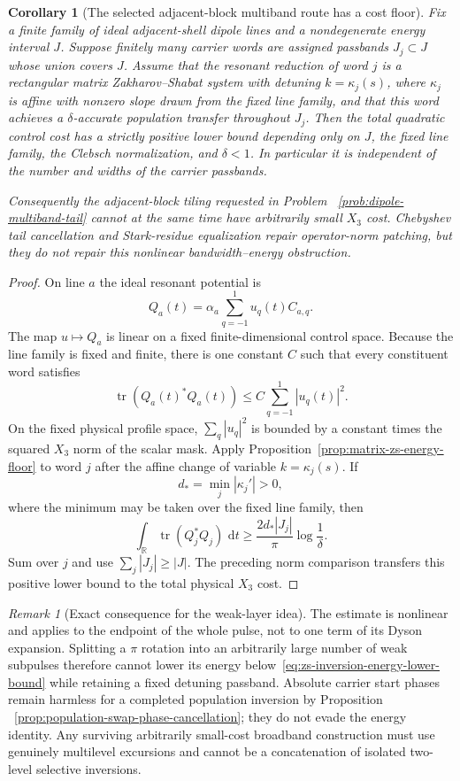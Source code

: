 \documentclass[11pt]{article}
\newtheorem{corollary}[theorem]{Corollary}
\theoremstyle{remark}
\newtheorem{remark}[theorem]{Remark}
\newcommand{\dd}{\,\mathrm d}
\newcommand{\tr}{\operatorname{tr}}
\begin{document}
\begin{corollary}[The selected adjacent-block multiband route has a cost floor]
\label{cor:dipole-multiband-energy-no-go}
Fix a finite family of ideal adjacent-shell dipole lines and a nondegenerate
energy interval $J$.  Suppose finitely many carrier words are assigned
passbands $J_j\subset J$ whose union covers $J$.  Assume that the resonant
reduction of word $j$ is a rectangular matrix Zakharov--Shabat system with
detuning $k=\kappa_j(s)$, where $\kappa_j$ is affine with nonzero slope drawn
from the fixed line family, and that this word achieves a $\delta$-accurate
population transfer throughout $J_j$.  Then the total quadratic control cost
has a strictly positive lower bound depending only on $J$, the fixed line
family, the Clebsch normalization, and $\delta<1$.  In particular it is
independent of the number and widths of the carrier passbands.

Consequently the adjacent-block tiling requested in Problem
~\ref{prob:dipole-multiband-tail} cannot at the same time have arbitrarily
small $X_3$ cost.  Chebyshev tail cancellation and Stark-residue equalization
repair operator-norm patching, but they do not repair this nonlinear
bandwidth--energy obstruction.
\end{corollary}

\begin{proof}
On line $a$ the ideal resonant potential is
\[
 Q_a(t)=\alpha_a\sum_{q=-1}^{1}u_q(t)C_{a,q}.
\]
The map $u\mapsto Q_a$ is linear on a fixed finite-dimensional control space.
Because the line family is fixed and finite, there is one constant $C$ such
that every constituent word satisfies
\[
 \tr(Q_a(t)^*Q_a(t))
 \leq C\sum_{q=-1}^{1}|u_q(t)|^2.
\]
On the fixed physical profile space,
$\sum_q|u_q|^2$ is bounded by a constant times the squared $X_3$ norm of the
scalar mask.  Apply Proposition~\ref{prop:matrix-zs-energy-floor} to word $j$
after the affine change of variable $k=\kappa_j(s)$.  If
\[
 d_*=\min_j|\kappa_j'|>0,
\]
where the minimum may be taken over the fixed line family, then
\[
 \int_{\mathbb R}\tr(Q_j^*Q_j)\,\dd t
 \geq
 \frac{2d_*|J_j|}{\pi}\log\frac1\delta.
\]
Sum over $j$ and use $\sum_j|J_j|\geq|J|$.  The preceding norm comparison
transfers this positive lower bound to the total physical $X_3$ cost.
\end{proof}

\begin{remark}[Exact consequence for the weak-layer idea]
\label{rem:weak-layer-energy-no-go}
The estimate is nonlinear and applies to the endpoint of the whole pulse, not
to one term of its Dyson expansion.  Splitting a $\pi$ rotation into an
arbitrarily large number of weak subpulses therefore cannot lower its energy
below~\eqref{eq:zs-inversion-energy-lower-bound} while retaining a fixed
detuning passband.  Absolute carrier start phases remain harmless for a
completed population inversion by Proposition
~\ref{prop:population-swap-phase-cancellation}; they do not evade the energy
identity.  Any surviving arbitrarily small-cost broadband construction must
use genuinely multilevel excursions and cannot be a concatenation of isolated
two-level selective inversions.
\end{remark}
\end{document}
